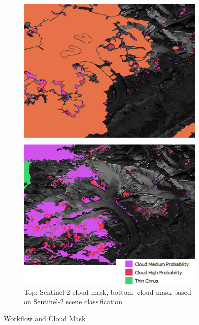 \documentclass[12pt]{article}
\begin{document}
\begin{figure}[h]
\begin{subfigure}[height=7cm]{0.45\textwidth}
	\end{subfigure}
	\hspace{0.5cm}
  	\begin{subfigure}[height=7cm]{0.45\textwidth}
    \includegraphics[width=\textwidth]{cloud_mask}
	\caption{Top: Sentinel-2 cloud mask, bottom: cloud mask based on Sentinel-2 scene classification}
			\label{fig:cloud_mask}
	\end{subfigure}
  \caption{Workflow and Cloud Mask}
  \label{fig:workflow_and_cloud_mask}
\end{figure}
\end{document}
